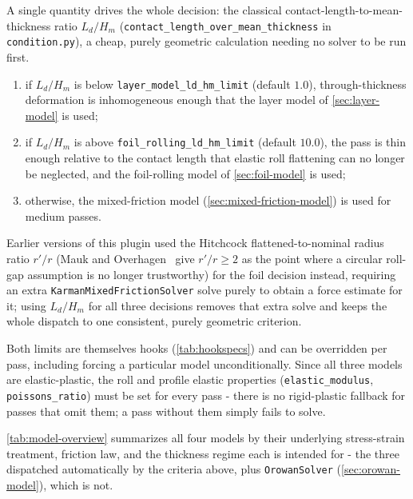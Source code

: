 \documentclass[11pt]{PyRollDocs}
\begin{document}
    A single quantity drives the whole decision: the classical contact-length-to-mean-thickness ratio $L_d/H_m$ (\lstinline{contact_length_over_mean_thickness} in \lstinline{condition.py}), a cheap, purely geometric calculation needing no solver to be run first.

    \begin{enumerate}
        \item if $L_d/H_m$ is below \lstinline{layer_model_ld_hm_limit} (default $1.0$), through-thickness deformation is inhomogeneous enough that the layer model of \autoref{sec:layer-model} is used;
        \item if $L_d/H_m$ is above \lstinline{foil_rolling_ld_hm_limit} (default $10.0$), the pass is thin enough relative to the contact length that elastic roll flattening can no longer be neglected, and the foil-rolling model of \autoref{sec:foil-model} is used;
        \item otherwise, the mixed-friction model (\autoref{sec:mixed-friction-model}) is used for medium passes.
    \end{enumerate}

    Earlier versions of this plugin used the Hitchcock flattened-to-nominal radius ratio $r'/r$ (Mauk and Overhagen~\cite{MaukOverhagen2013} give $r'/r \geq 2$ as the point where a circular roll-gap assumption is no longer trustworthy) for the foil decision instead, requiring an extra \lstinline{KarmanMixedFrictionSolver} solve purely to obtain a force estimate for it; using $L_d/H_m$ for all three decisions removes that extra solve and keeps the whole dispatch to one consistent, purely geometric criterion.

    Both limits are themselves hooks (\autoref{tab:hookspecs}) and can be overridden per pass, including forcing a particular model unconditionally. Since all three models are elastic-plastic, the roll and profile elastic properties (\lstinline{elastic_modulus}, \lstinline{poissons_ratio}) must be set for every pass - there is no rigid-plastic fallback for passes that omit them; a pass without them simply fails to solve.

    \autoref{tab:model-overview} summarizes all four models by their underlying stress-strain treatment, friction law, and the thickness regime each is intended for - the three dispatched automatically by the criteria above, plus \lstinline{OrowanSolver} (\autoref{sec:orowan-model}), which is not.
\end{document}
